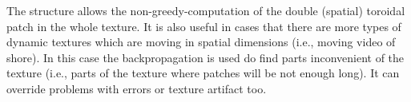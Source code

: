 
	

	
	
	The structure allows the non-greedy-computation of the double (spatial) toroidal patch in the whole texture. It is also useful in cases that there are more types of dynamic textures which are moving in spatial dimensions (i.e., moving video of shore). In this case the backpropagation is used do find parts inconvenient of the texture (i.e., parts of the texture where patches will be not enough long). It can override problems with errors or texture artifact too.
				
		
		

